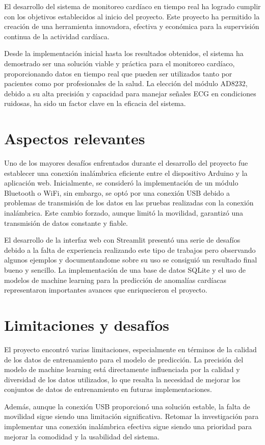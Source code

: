 
El desarrollo del sistema de monitoreo cardíaco en tiempo real ha logrado cumplir con los objetivos establecidos al inicio del proyecto. Este proyecto ha permitido la creación de una herramienta innovadora, efectiva y económica para la supervisión continua de la actividad cardíaca.

Desde la implementación inicial hasta los resultados obtenidos, el sistema ha demostrado ser una solución viable y práctica para el monitoreo cardíaco, proporcionando datos en tiempo real que pueden ser utilizados tanto por pacientes como por profesionales de la salud. La elección del módulo AD8232, debido a su alta precisión y capacidad para manejar señales ECG en condiciones ruidosas, ha sido un factor clave en la eficacia del sistema.

\section{Aspectos relevantes}

Uno de los mayores desafíos enfrentados durante el desarrollo del proyecto fue establecer una conexión inalámbrica eficiente entre el dispositivo Arduino y la aplicación web. Inicialmente, se consideró la implementación de un módulo Bluetooth o WiFi, sin embargo, se optó por una conexión USB debido a problemas de transmisión de los datos en las pruebas realizadas con la conexión inalámbrica. Este cambio forzado, aunque limitó la movilidad, garantizó una transmisión de datos constante y fiable.

El desarrollo de la interfaz web con Streamlit presentó una serie de desafíos debido a la falta de experiencia realizando este tipo de trabajos pero observando algunos ejemplos y documentandome sobre su uso se consiguió un resultado final bueno y sencillo. La implementación de una base de datos SQLite y el uso de modelos de machine learning para la predicción de anomalías cardíacas representaron importantes avances que enriquecieron el proyecto.

\section{Limitaciones y desafíos}

El proyecto encontró varias limitaciones, especialmente en términos de la calidad de los datos de entrenamiento para el modelo de predicción. La precisión del modelo de machine learning está directamente influenciada por la calidad y diversidad de los datos utilizados, lo que resalta la necesidad de mejorar los conjuntos de datos de entrenamiento en futuras implementaciones.

Además, aunque la conexión USB proporcionó una solución estable, la falta de movilidad sigue siendo una limitación significativa. Retomar la investigación para implementar una conexión inalámbrica efectiva sigue siendo una prioridad para mejorar la comodidad y la usabilidad del sistema.


